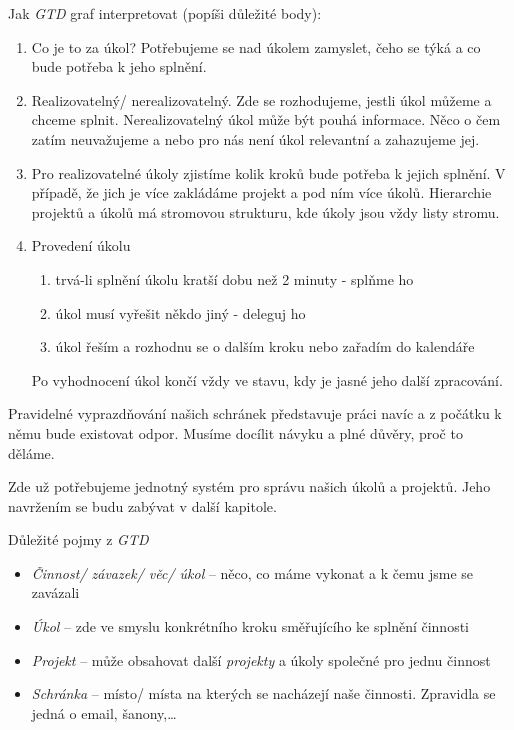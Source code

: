\documentclass[thesis=B,czech]{FITthesis}[2012/06/26]
\newcommand{\GTD}{\textit{GTD }}
\begin{document}
Jak \GTD graf interpretovat (popíši důležité body):
\begin{enumerate}[nosep]
\item Co je to za úkol?
Potřebujeme se nad úkolem zamyslet, čeho se týká a co bude potřeba k jeho splnění. 
\item Realizovatelný/ nerealizovatelný. 
Zde se rozhodujeme, jestli úkol můžeme a chceme splnit. Nerealizovatelný úkol může být pouhá informace. Něco o čem zatím neuvažujeme a nebo pro nás není úkol relevantní a zahazujeme jej.
\item Pro realizovatelné úkoly zjistíme kolik kroků bude potřeba k jejich splnění. V případě, že jich je více zakládáme projekt a pod ním více úkolů. Hierarchie projektů a úkolů má stromovou strukturu, kde úkoly jsou vždy listy stromu.
\item Provedení úkolu
	\begin{enumerate}[nosep]
		\item trvá-li splnění úkolu kratší dobu než 2 minuty - splňme ho
		\item úkol musí vyřešit někdo jiný - deleguj ho
		\item úkol řeším a rozhodnu se o dalším kroku nebo zařadím do kalendáře
	\end{enumerate}
	Po vyhodnocení úkol končí vždy ve stavu, kdy je jasné jeho další zpracování.
\end{enumerate}
\vspace*{1\baselineskip}

Pravidelné vyprazdňování našich schránek představuje práci navíc a z počátku k němu bude existovat odpor. Musíme docílit návyku a plné důvěry, proč to děláme.

Zde už potřebujeme jednotný systém pro správu našich úkolů a projektů. Jeho navržením se budu zabývat v další kapitole.


Důležité pojmy z \GTD
\begin{itemize}
	\item \textit{Činnost/ závazek/ věc/ úkol} -- něco, co máme vykonat a k čemu jsme se zavázali
	\item \textit{Úkol} -- zde ve smyslu konkrétního kroku směřujícího ke splnění činnosti 
	\item \textit{Projekt} -- může obsahovat další \textit{projekty} a úkoly společné pro jednu činnost 
	\item \textit{Schránka} -- místo/ místa na kterých se nacházejí naše činnosti. Zpravidla se jedná o email, šanony,\dots	
\end{itemize}
\end{document}
